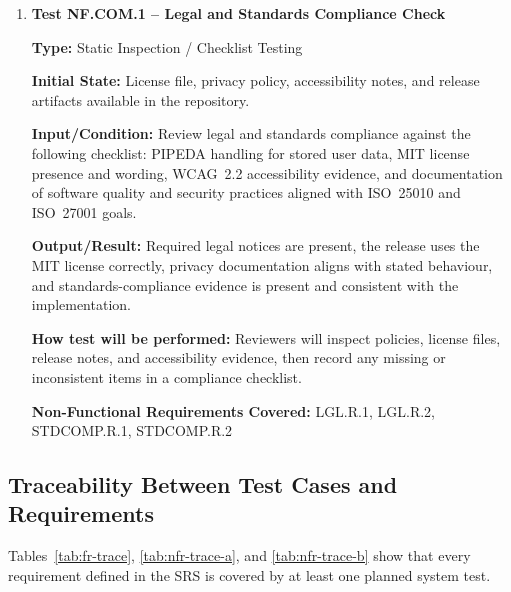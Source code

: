\documentclass[12pt, titlepage]{article}
\begin{document}
\begin{enumerate}

\item \textbf{Test NF.COM.1 -- Legal and Standards Compliance Check}

\textbf{Type:} Static Inspection / Checklist Testing

\textbf{Initial State:} License file, privacy policy, accessibility
notes, and release artifacts available in the repository.

\textbf{Input/Condition:} Review legal and standards compliance against
the following checklist:
PIPEDA handling for stored user data, MIT license presence and wording,
WCAG~2.2 accessibility evidence, and documentation of software quality
and security practices aligned with ISO~25010 and ISO~27001 goals.

\textbf{Output/Result:} Required legal notices are present, the release
uses the MIT license correctly, privacy documentation aligns with stated
behaviour, and standards-compliance evidence is present and consistent
with the implementation.

\textbf{How test will be performed:} Reviewers will inspect policies,
license files, release notes, and accessibility evidence, then record
any missing or inconsistent items in a compliance checklist.

\textbf{Non-Functional Requirements Covered:} LGL.R.1, LGL.R.2,
STDCOMP.R.1, STDCOMP.R.2

\end{enumerate}

\subsection{Traceability Between Test Cases and Requirements}
\label{section:5.3}

Tables~\ref{tab:fr-trace}, \ref{tab:nfr-trace-a}, and
\ref{tab:nfr-trace-b} show that every requirement defined in the SRS
is covered by at least one planned system test.
\end{document}
